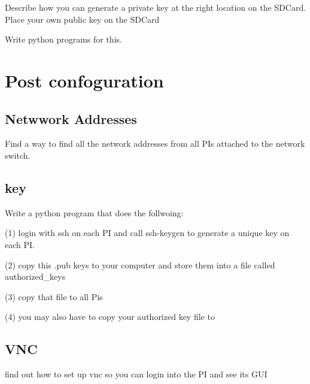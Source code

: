 \begin{exercise}
Describe how you can generate a private key at the right location on
the SDCard. Place your own public key on the SDCard

Write python programs for this.
\end{exercise}


\section{Post confoguration}

\subsection{Netwwork Addresses}

\begin{exercise}
Find a way to find all the network addresses from all PIs attached to
the network switch.
\end{exercise}


\subsection{key}

\begin{exercise}

Write a python program that does the follwoing:

(1) login with ssh on each PI and call ssh-keygen to generate a unique
key on each PI.

(2) copy this .pub keys to your computer and store them into a file
called authorized_keys

(3) copy that file to all Pis

(4) you may also have to copy your authorized key file to 

\end{exercise}

\subsection{VNC}

\begin{exercise}
find out how to set up vnc so you can login into the PI and see its GUI
\end{exercise}


